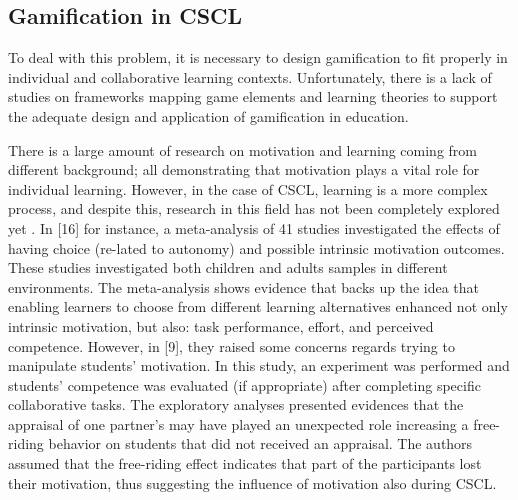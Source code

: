\subsection{Gamification in CSCL}

To deal with this problem, it is necessary to design gamification to fit properly in individual and collaborative learning contexts. Unfortunately, there is a lack of studies on frameworks mapping game elements and learning theories to support the adequate design and application of gamification in education. 


There is a large amount of research on motivation and learning coming from different background; all demonstrating that motivation plays a vital role for individual learning. However, in the case of CSCL, learning is a more complex process, and despite this, research in this field has not been completely explored yet \cite{Motivation_in_a_computer-supported_collaborative_learning}. In [16] for instance, a meta-analysis of 41 studies investigated the effects of having choice (re-lated to autonomy) and possible intrinsic motivation outcomes. These studies investigated both children and adults samples in different environments. The meta-analysis shows evidence that backs up the idea that enabling learners to choose from different learning alternatives enhanced not only intrinsic motivation, but also: task performance, effort, and perceived competence. However, in [9], they raised some concerns regards trying to manipulate students’ motivation. In this study, an experiment was performed and students' competence was evaluated (if appropriate) after completing specific collaborative tasks. The exploratory analyses presented evidences that the appraisal of one partner’s may have played an unexpected role increasing a free-riding behavior on students that did not received an appraisal. The authors assumed that the free-riding effect indicates that part of the participants lost their motivation, thus suggesting the influence of motivation also during CSCL. 


